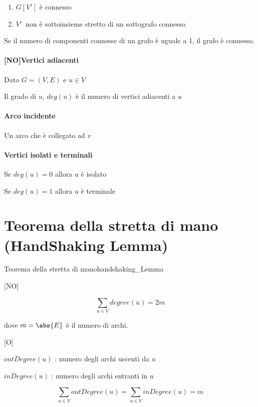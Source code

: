 \begin{enumerate}
\tightlist
\item
  {$G[V']$ è connesso}
\item
  $V'${~non è sottoinsieme stretto di un sottografo connesso}
\end{enumerate}

{Se il numero di componenti connesse di un grafo è uguale a 1, il grafo è connesso.}

\paragraph{{[}NO{]}Vertici adiacenti}

{Dato $G=(V,E)$ e $u \in V$}

{Il grado di $u$, $deg(u)$ è il numero di vertici adiacenti a $u$}

\paragraph{Arco incidente}

{Un arco che è collegato ad $v$}

\paragraph{Vertici isolati e terminali}

{Se $deg(u) = 0$ allora $u$ è isolato}

{Se $deg(u) = 1$ allora $u$ è terminale}

\section{Teorema della stretta di mano (HandShaking Lemma)}


\begin{lemma}{Teorema della stretta di mano}{handshaking_Lemma}

{{[}NO{]}}

\begin{equation}
\sum_{u \in V}{degree(u)} = 2m
\end{equation}

{dove $m = \abs{E}$ è il numero di archi.}

{{[}O{]}}

{$outDegree(u)$ : numero degli archi uscenti da $u$}

{$inDegree(u)$ : numero degli archi entranti in $u$}

\begin{equation}
\sum_{u \in V}{outDegree(u)} = \sum_{u \in V}{inDegree(u)} = m
\end{equation}

\end{lemma}




